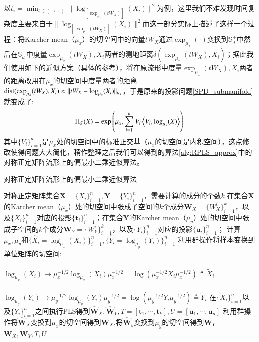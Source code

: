 以$t_i=\min_{t \in (-\epsilon,\epsilon)}\|\log_{[\exp_{\mu_x}(tW_X)]}(X_i)\|^2$为例，这里我们不难发现时间复杂度主要来自于$\|\log_{[\exp_{\mu_x}(tW_X)]}(X_i)\|^2$而这一部分实际上描述了这样一个过程：将Karcher mean（$\mu_x$）的切空间中的向量$tW_X$通过$\exp_{\mu_x}(\cdot)$变换到$\mathbb{S}_{d}^{+}$中然后在$\mathbb{S}_{d}^{+}$中度量$\exp_{\mu_x}(tW_X),X_i$两者的测地距离$\delta(\exp_{\mu_x}(tW_X),X_i)$；据此我们使用如下的近似方案（具体的参考\cite{PGA}），将在原流形中度量$\exp_{\mu_x}(tW_X),X_i$两者的距离改用在$\mu_x$的切空间中度量两者的距离${\rm dist}(\exp_{\mu_x}(tW_X),X_i)\approx \|tW_X-\log_{\mu_x}(X_i)\|_{\mu_x}$，于是原来的投影问题\ref{SPD_submanifold}就变成了:
\begin{equation}
\label{tangent_approxiamte}
\Pi_{S}(X)=\exp\left(\mu_x,\sum_{i=1}^{k}V_i\left<V_i,\log_{\mu_x}(X)\right>\right)\\
\end{equation}
其中$\{V_i\}_{i=1}^{d}$是$\mu_x$处的切空间中的标准正交基（$\mu_x$的切空间是内积空间），这点修改使得问题大大简化，稍作整理之后我们可以得到的算法\ref{alg:RPLS_approx}中的对称正定矩阵流形上的偏最小二乘近似算法。
\begin{algorithm}[htb]
\caption{对称正定矩阵流形上的偏最小二乘近似算法}
\label{alg:RPLS_approx}
\begin{algorithmic}[1]
\REQUIRE 对称正定矩阵集合$\bm{X}=\{X_i\}_{i=1}^{n},\bm{Y}=\{Y_i\}_{i=1}^{n}$，需要计算的成分的个数$k$
\ENSURE 在集合$\bm{X}$的Karcher mean（$\mu_x$）处的切空间中张成子空间的$k$个成分$\bm{W}_{X}=\{W_{X}^{i}\}_{i=1}^{k}$，以及$\{X_i\}_{i=1}^{n}$对应的投影$\{\bm{t}_i\}_{i=1}^{n}$；在集合$\bm{Y}$的Karcher mean（$\mu_y$）处的切空间中张成子空间的$k$个成分$\bm{W}_{Y}=\{W_{Y}^{i}\}_{i=1}^{k}$，以及$\{Y_i\}_{i=1}^{n}$对应的投影$\{\bm{u}_i\}_{i=1}^{n}$；
\STATE 计算$\mu_x, \mu_y$和$\{\hat{X}_i=\log_{\mu_{x}}(X_i)\}_{i=1}^{n}, \{\hat{Y}_i=\log_{\mu_{y}}(Y_i)\}_{i=1}^{n}$
\STATE 利用群操作将样本变换到单位矩阵的切空间:\\
~~~~~~~~~~~~~~~~~~~$\log_{\mu_{x}}(X_i)\rightarrow \mu_{x}^{-1/2}\log_{\mu_{x}}(X_i)\mu_{x}^{-1/2}=\log(\mu_{x}^{-1/2}X_i\mu_{x}^{-1/2})\triangleq \tilde{X}_i$\\
~~~~~~~~~~~~~~~~~~~$\log_{\mu_{y}}(Y_i)\rightarrow \mu_{y}^{-1/2}\log_{\mu_{y}}(Y_i)\mu_{y}^{-1/2}=\log(\mu_{y}^{-1/2}Y_i\mu_{y}^{-1/2})\triangleq \tilde{Y}_i$
\STATE 在$\{\tilde{X}_{i}\}_{i=1}^{n}$以及$\{\tilde{Y}_{i}\}_{i=1}^{n}$之间执行PLS得到$\hat{\bm{W}}_X,\hat{\bm{W}}_Y,T=[\bm{t}_1,\cdots,\bm{t}_k],U=[\bm{u}_1,\cdots,\bm{u}_n]$
\STATE 利用群操作将$\hat{\bm{W}}_X$变换到$\mu_x$的切空间得到$\bm{W}_X$,将$\hat{\bm{W}}_y$变换到$\mu_y$的切空间得到$\bm{W}_Y$
\RETURN $\bm{W}_X,\bm{W}_Y,T,U$
\end{algorithmic}
\end{algorithm}

